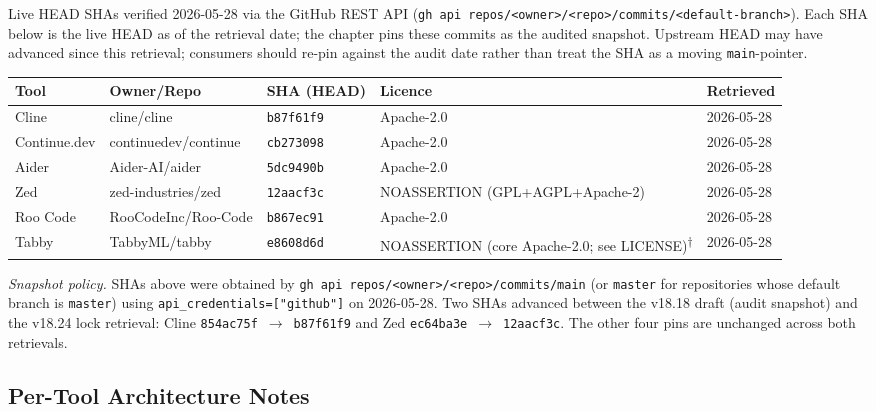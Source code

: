 Live HEAD SHAs verified 2026-05-28 via the GitHub REST API
(\texttt{gh api repos/<owner>/<repo>/commits/<default-branch>}).  Each SHA
below is the live HEAD as of the retrieval date; the chapter pins these
commits as the audited snapshot.  Upstream HEAD may have advanced since
this retrieval; consumers should re-pin against the audit date rather than
treat the SHA as a moving \texttt{main}-pointer.

\begin{center}
\begin{tabular}{lllll}
\textbf{Tool} & \textbf{Owner/Repo} & \textbf{SHA (HEAD)} & \textbf{Licence} & \textbf{Retrieved} \\
\hline
Cline & cline/cline & \texttt{b87f61f9} & Apache-2.0 & 2026-05-28 \\
Continue.dev & continuedev/continue & \texttt{cb273098} & Apache-2.0 & 2026-05-28 \\
Aider & Aider-AI/aider & \texttt{5dc9490b} & Apache-2.0 & 2026-05-28 \\
Zed & zed-industries/zed & \texttt{12aacf3c} & NOASSERTION (GPL+AGPL+Apache-2) & 2026-05-28 \\
Roo Code & RooCodeInc/Roo-Code & \texttt{b867ec91} & Apache-2.0 & 2026-05-28 \\
Tabby & TabbyML/tabby & \texttt{e8608d6d} & NOASSERTION (core Apache-2.0; see LICENSE)\textsuperscript{$\dagger$} & 2026-05-28 \\
\end{tabular}
\end{center}

\noindent\emph{Snapshot policy.}  SHAs above were obtained by
\texttt{gh api repos/<owner>/<repo>/commits/main} (or \texttt{master} for
repositories whose default branch is \texttt{master}) using
\texttt{api\_credentials=["github"]} on 2026-05-28.  Two SHAs advanced
between the v18.18 draft (audit snapshot) and the v18.24 lock retrieval:
Cline \texttt{854ac75f}~$\rightarrow$~\texttt{b87f61f9} and Zed
\texttt{ec64ba3e}~$\rightarrow$~\texttt{12aacf3c}.  The other four pins
are unchanged across both retrievals.

\subsection{Per-Tool Architecture Notes}
\label{ssec:ide-architecture}

